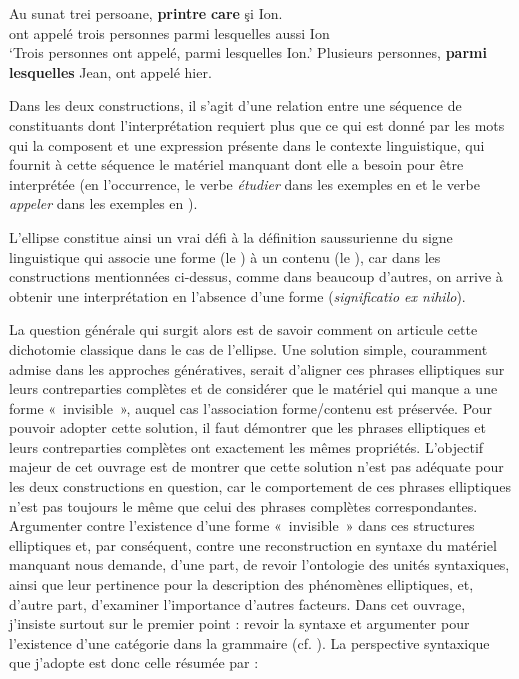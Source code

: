 \ea \label{ch0:ex2}
\ea
\gll Au sunat trei  persoane,  {\ob}\textbf{printre}  \textbf{care}  şi  Ion{\cb}.   \label{ch0:ex2a}\\ 
ont  appelé  trois  personnes  parmi  lesquelles  aussi  Ion\\
\glt ‘Trois personnes ont appelé, parmi lesquelles Ion.’
\ex  Plusieurs personnes, {\ob}\textbf{parmi lesquelles} Jean{\cb}, ont appelé hier.   \label{ch0:ex2b}
\z
\z



Dans les deux constructions, il s’agit d’une relation entre une séquence de constituants dont l’interprétation requiert plus que ce qui est donné par les mots qui la composent et une expression présente dans le contexte linguistique, qui fournit à cette séquence le matériel manquant dont elle a besoin pour être interprétée (en l’occurrence, le verbe \textit{étudier} dans les exemples en  et le verbe \textit{appeler} dans les exemples en ).



L’ellipse constitue ainsi un vrai défi à la définition saussurienne du signe linguistique qui associe une forme (le ) à un contenu (le ), car dans les constructions mentionnées ci-dessus, comme dans beaucoup d’autres, on arrive à obtenir une interprétation en l’absence d’une forme (\textit{significatio ex nihilo}). 



La question générale qui surgit alors est de savoir comment on articule cette dichotomie classique dans le cas de l’ellipse. Une solution simple, couramment admise dans les approches génératives, serait d’aligner ces phrases elliptiques sur leurs contreparties complètes et de considérer que le matériel qui manque a une forme «~invisible~», auquel cas l’association forme/contenu est préservée. Pour pouvoir adopter cette solution, il faut démontrer que les phrases elliptiques et leurs contreparties complètes ont exactement les mêmes propriétés. L’objectif majeur de cet ouvrage est de montrer que cette solution n’est pas adéquate pour les deux constructions en question, car le comportement de ces phrases elliptiques n’est pas toujours le même que celui des phrases complètes correspondantes. Argumenter contre l’existence d’une forme «~invisible~» dans ces structures elliptiques et, par conséquent, contre une reconstruction en syntaxe du matériel manquant nous demande, d’une part, de revoir l’ontologie des unités syntaxiques, ainsi que leur pertinence pour la description des phénomènes elliptiques, et, d’autre part, d’examiner l’importance d’autres facteurs. Dans cet ouvrage, j’insiste surtout sur le premier point : revoir la syntaxe et argumenter pour l’existence d’une catégorie \textit{} dans la grammaire (cf. \citealt{GinzburgEtAl2000}). La perspective syntaxique que j’adopte est donc celle résumée par \citet[5]{CulicoverEtAl2005}:

